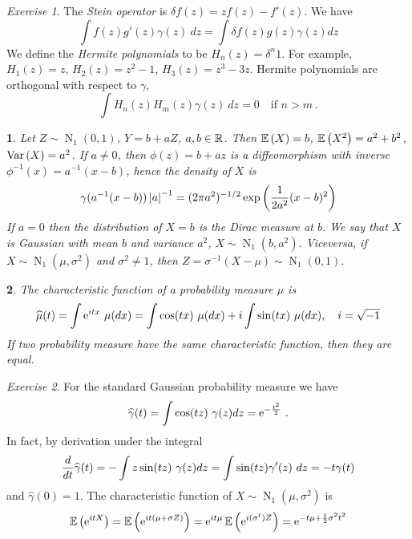 \documentclass[12pt,a4paper]{amsart}
\newcommand{\gaussian}[3]{\operatorname{N}_{#1}\left(#2,#3\right)}
\theoremstyle{plain}%
\newtheorem{npar}{}%
\theoremstyle{definition}
\theoremstyle{remark}
\newtheorem{exercise}{Exercise}
\begin{document}
\begin{exercise}
  The \emph{Stein operator} is $\delta f(z) = zf(z) - f'(z)$. We have
\begin{equation*}
  \int f(z) g'(z) \gamma(z) \ dz =  \int \delta f(z) g(z) \gamma(z) dz
\end{equation*}
We define the \emph{Hermite polynomials} to be $H_n(z) = \delta^n 1$. For example, $H_1(z) = z$, $H_2(z) = z^2 -1$, $H_3(z) = z^3 - 3z$. Hermite polynomials are orthogonal with respect to $\gamma$,
\begin{equation*}
  \int H_n(z) H_m(z) \gamma(z) \ dz = 0 \quad \text{if $n > m$} \ .
\end{equation*}
\end{exercise}

\begin{npar} \normalfont
Let $Z \sim \gaussian 1 0 1$, $Y = b + a Z$, $a,b \in \mathbb{R}$. Then $\operatorname{\mathbb E}\left(X\right) = b$, $\operatorname{\mathbb E}\left(X^2\right) = a^2 + b^2$, $\operatorname{Var}\left(X\right) = a^2$. If $a \ne 0$, then $\phi(z) = b +a z$ is a diffeomorphism with inverse $\phi^{-1} (x) = a^{-1}(x-b)$, hence the density of $X$ is 
\begin{equation*}
  \gamma(a^{-1}(x-b))\left\vert a\right\vert^{-1} = (2\pi a^2)^{-1/2}\exp\left(\frac1{2a^2}(x-b)^2\right)
\end{equation*}
If $a=0$ then the distribution of $X=b$ is the Dirac measure at $b$. We say that $X$ is Gaussian with mean $b$ and variance $a^2$, $X \sim \gaussian 1 b {a^2}$. Viceversa, if $X \sim \gaussian 1 \mu {\sigma^2}$ and $\sigma^2 \ne 1$, then $Z = \sigma^{-1}(X - \mu) \sim \gaussian 1 0 1$.
\end{npar}

\begin{npar} \normalfont
The \emph{characteristic function} of a probability measure $\mu$ is
\begin{equation*}
  \widehat \mu(t) = \int \euler^{itx} \ \mu(dx) = \int \cos(tx) \ \mu(dx) + i \int \sin(tx) \ \mu(dx), \quad i = \sqrt{-1}
\end{equation*}
If two probability measure have the same characteristic function, then they are equal.
\end{npar}

\begin{exercise}
For the standard Gaussian probability measure we have
\begin{equation*}
  \widehat \gamma(t) = \int \cos(tz) \ \gamma(z) dz = \euler^{-\frac{t^2}2} \ .
\end{equation*}
In fact, by derivation under the integral
\begin{equation*}
  \frac{d}{dt} \widehat \gamma(t) =  -\int z \sin(tz) \ \gamma(z) dz = \int \sin(tz) \gamma'(z) \ dz = - t \gamma(t)
\end{equation*}
and $\widehat \gamma(0) = 1$.
The characteristic function of $X \sim \gaussian 1 \mu {\sigma^2}$ is
\begin{equation*}
  \operatorname{\mathbb E}\left(\mathrm{e}^{itX}\right) = \operatorname{\mathbb E}\left(\mathrm{e}^{it(\mu + \sigma Z)}\right) = \mathrm{e}^{it\mu} \operatorname{\mathbb E}\left(\mathrm{e}^{i(\sigma^t)Z}\right) = \mathrm{e}^{-t\mu+\frac12\sigma^2t^2}
\end{equation*}
\end{exercise}
\end{document}
